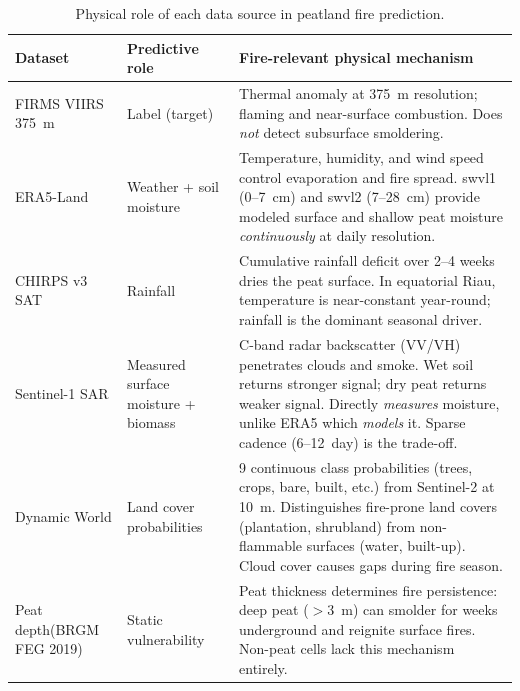 \begin{table}[h]
\centering
\caption{Physical role of each data source in peatland fire prediction.}
\label{tab:dataset_role}
\begin{tabular}{p{2.4cm} p{2.9cm} p{5.7cm}}
\toprule
\textbf{Dataset} & \textbf{Predictive role} & \textbf{Fire-relevant physical mechanism} \\
\midrule
FIRMS VIIRS 375~m
    & Label (target)
    & Thermal anomaly at 375~m resolution;
      flaming and near-surface combustion.
      Does \textit{not} detect subsurface smoldering. \\
\addlinespace
ERA5-Land
    & Weather + soil moisture
    & Temperature, humidity, and wind speed control evaporation and fire spread.
      swvl1 (0--7~cm) and swvl2 (7--28~cm) provide modeled surface and shallow peat moisture
      \textit{continuously} at daily resolution. \\
\addlinespace
CHIRPS v3 SAT
    & Rainfall
    & Cumulative rainfall deficit over 2--4 weeks dries the peat surface.
      In equatorial Riau, temperature is near-constant year-round;
      rainfall is the dominant seasonal driver. \\
\addlinespace
Sentinel-1 SAR
    & Measured surface moisture + biomass
    & C-band radar backscatter (VV/VH) penetrates clouds and smoke.
      Wet soil returns stronger signal; dry peat returns weaker signal.
      Directly \textit{measures} moisture, unlike ERA5 which \textit{models} it.
      Sparse cadence (6--12~day) is the trade-off. \\
\addlinespace
Dynamic World
    & Land cover probabilities
    & 9 continuous class probabilities (trees, crops, bare, built, etc.)
      from Sentinel-2 at 10~m.
      Distinguishes fire-prone land covers (plantation, shrubland)
      from non-flammable surfaces (water, built-up).
      Cloud cover causes gaps during fire season. \\
\addlinespace
Peat depth\hfill (BRGM FEG 2019)
    & Static vulnerability
    & Peat thickness determines fire persistence:
      deep peat ($>\!3$~m) can smolder for weeks underground and reignite surface fires.
      Non-peat cells lack this mechanism entirely. \\
\bottomrule
\end{tabular}
\end{table}
